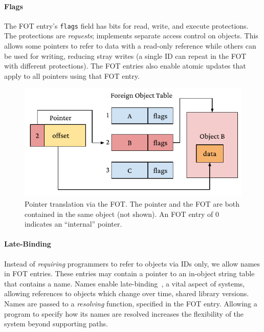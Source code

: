 \paragraph{Flags}
The FOT entry's \texttt{flags} field has bits for read, write, and execute protections. The
protections are \textit{requests}; \Twizzler implements separate access control on objects.
This allows some pointers to refer to data with a read-only reference while others can be used for
writing, reducing stray writes (a single ID can repeat in the FOT with different protections).
The FOT entries also enable atomic updates that apply to all pointers using
that FOT entry.

\begin{figure}
    \includegraphics[width=\linewidth]{fig/ptrfot}
    \caption[FOT translation]{Pointer translation via the FOT\@.
        The pointer and the FOT
        are both contained in the same object (not shown). An FOT entry of $0$ indicates an ``internal''
        pointer.
    }
    \label{fig:fottran}
\end{figure}

\paragraph{Late-Binding}

Instead of \emph{requiring} programmers to refer to objects via IDs only, we allow
names in FOT entries. These entries may contain a pointer to an
in-object string table that contains a name.
Names enable late-binding~\cite{daley:cacm68}, a
vital aspect of systems, allowing references to objects which change over time, \eg shared library versions.
Names are passed to a \textit{resolving} function, specified in the FOT entry.
Allowing a program to specify how its names are resolved
increases the flexibility of the system beyond supporting \unix paths.

